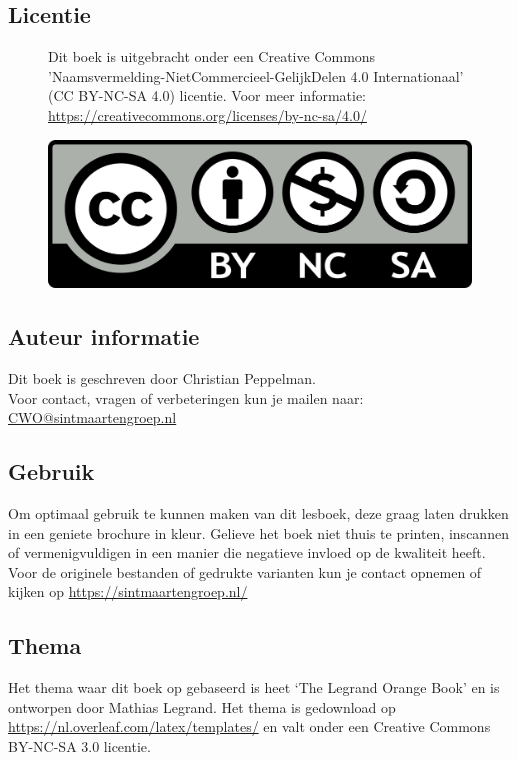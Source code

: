 \subsection*{Licentie}
\begin{figure}[H]
	\centering
	\begin{minipage}[t]{0.60\textwidth}
		\vspace{-1.80cm}
		Dit boek is uitgebracht onder een Creative Commons
		'Naamsvermelding-NietCommercieel-GelijkDelen 4.0 Internationaal' (CC BY-NC-SA 4.0) licentie. Voor meer informatie: \url{https://creativecommons.org/licenses/by-nc-sa/4.0/}
	\end{minipage}
	\hfill
	\begin{minipage}[b]{0.35\textwidth}
	\includegraphics[width=\textwidth]{../Hoofdstukken/Informatie/CC-BY-NC-SA.png}
\end{minipage}
\end{figure}
\subsection*{Auteur informatie}
Dit boek is geschreven door Christian Peppelman.\\ 
Voor contact, vragen of verbeteringen kun je mailen naar: \href{mailto:cwo@sintmaartengroep.nl}{CWO@sintmaartengroep.nl} 
\subsection*{Gebruik}
Om optimaal gebruik te kunnen maken van dit lesboek, deze graag laten drukken in een geniete brochure in kleur. Gelieve het boek niet thuis te printen, inscannen of vermenigvuldigen in een manier die negatieve invloed op de kwaliteit heeft. Voor de originele bestanden of gedrukte varianten kun je contact opnemen of kijken op \url{https://sintmaartengroep.nl/}
\subsection*{Thema}
Het thema waar dit boek op gebaseerd is heet `The Legrand Orange Book' en is ontworpen door Mathias Legrand. Het thema is gedownload op \url{https://nl.overleaf.com/latex/templates/} en valt onder een Creative Commons BY-NC-SA 3.0 licentie.
